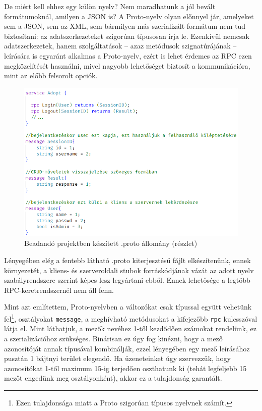 \documentclass[tocnopagenum]{thesis-ekf}
\begin{document}
	De miért kell ehhez egy külön nyelv? Nem maradhatunk a jól bevált formátumoknál, amilyen a JSON is? A Proto-nyelv olyan előnnyel jár, amelyeket sem a JSON, sem az XML, sem bármilyen más szerializált formátum nem tud biztosítani: az adatszerkezeteket szigorúan típusosan írja le. Ezenkívül nemcsak adatszerkezetek, hanem szolgáltatások -- azaz metódusok szignatúrájának -- leírására is egyaránt alkalmas a Proto-nyelv, ezért is lehet érdemes az RPC ezen megközelítését használni, mivel nagyobb lehetőséget biztosít a kommunikációra, mint az előbb felsorolt opciók.
	\begin{figure}[h]
		\centering
		\includegraphics[scale=0.45]{protobuf}
		\caption{Beadandó projektben készített .proto állomány (részlet)}
		\label{fig:protobuf}
	\end{figure}
	
	Lényegében elég a fentebb látható .proto kiterjesztésű fájlt elkészítenünk, ennek környezetét, a kliens- és szerveroldali stubok forráskódjának vázát az adott nyelv szabályrendszere szerint képes lesz legyártani ebből. Ennek lehetősége a legtöbb RPC-keretrendszernél nem áll fenn.
	
	Mint azt említettem, Proto-nyelvben a változókat csak típussal együtt vehetünk fel\footnote{Ezen tulajdonsága miatt a Proto szigorúan típusos nyelvnek számít.}, osztályokat \verb*|message|, a meghívható metódusokat a kifejezőbb \verb*|rpc| kulcsszóval látja el. Mint láthatjuk, a mezők nevéhez 1-től kezdődően számokat rendelünk, ez a szerializációhoz szükséges. Binárisan ez úgy fog kinézni, hogy a mező azonosítóját annak típusával kombinálják, ezzel lényegében egy mező leírásához pusztán 1 bájtnyi terület elegendő. Ha üzeneteinket úgy szervezzük, hogy azonosítókat 1-től maximum 15-ig terjedően oszthatunk ki (tehát legfeljebb 15 mezőt engedünk meg osztályonként), akkor ez a tulajdonság garantált. 
	
\end{document}
